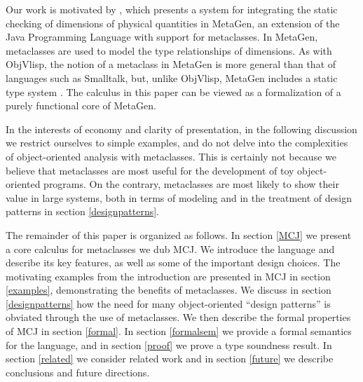 \documentclass{acm-sigplan}
\begin{document}
Our work is motivated by \cite{DimUnits}, which presents a system for
integrating the static checking of dimensions of physical quantities
in MetaGen, an extension of the Java Programming Language with support
for metaclasses. In MetaGen, metaclasses are used to model the type
relationships of dimensions.  As with ObjVlisp, the notion of a
metaclass in MetaGen is more general than that of languages such as
Smalltalk, but, unlike ObjVlisp, MetaGen includes a static type system
\cite{DimUnits}. The calculus in this paper can be viewed as a
formalization of a purely functional core of MetaGen.

In the interests of economy and clarity of presentation, in the
following discussion we restrict ourselves to simple examples, and do
not delve into the complexities of object-oriented analysis with metaclasses.  
This is certainly not because we believe that
metaclasses are most useful for the development of toy object-oriented
programs.  On the contrary, metaclasses are most likely to show their value
in large systems, both in terms of modeling and in the treatment of
design patterns in section \ref{designpatterns}.

The remainder of this paper is organized as follows.  In section
\ref{MCJ} we present a core calculus for metaclasses we dub MCJ.
We introduce the language and describe its key features, as
well as some of the important design choices.  The motivating examples
from the introduction are presented in MCJ in section \ref{examples},
demonstrating the benefits of metaclasses. We discuss in section
\ref{designpatterns} how the need for many object-oriented ``design
patterns'' is obviated through the use of metaclasses. We then
describe the formal properties of MCJ in section \ref{formal}.  In section
\ref{formalsem} we provide a formal semantics for the language, and in
section \ref{proof} we prove a type soundness result.  In section
\ref{related} we consider related work and in section \ref{future} we
describe conclusions and future directions.

\end{document}

